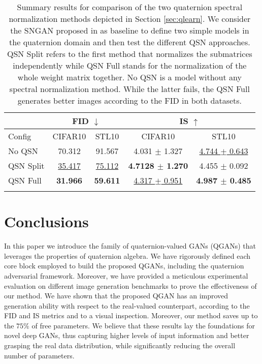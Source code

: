 \documentclass[graybox]{svmult}
\begin{document}
\begin{table}[t]
\caption{Summary results for comparison of the two quaternion spectral normalization methods depicted in Section \ref{sec:qlearn}. We consider the SNGAN proposed in \cite{Miyato2018SpectralNF} as baseline to define two simple models in the quaternion domain and then test the different QSN approaches. QSN Split refers to the first method that normalizes the submatrices independently while QSN Full stands for the normalization of the whole weight matrix together. No QSN is a model without any spectral normalization method. While the latter fails, the QSN Full generates better images according to the FID in both datasets.}
\centering
\begin{tabular}{@{}lcccc@{}}
\hline\noalign{\smallskip}
          & \multicolumn{2}{c}{FID $\downarrow$}           & \multicolumn{2}{c}{IS $\uparrow$}                              \\ \midrule
Config    & CIFAR10         & STL10           & CIFAR10                   & STL10                   \\
No QSN    & 70.312          &  91.567         & 4.031 $\pm$ 1.327 &  \underline{4.744 $\pm$ 0.643}          \\
QSN Split & \underline{35.417}          & \underline{75.112}          & \textbf{4.7128 $\pm$ 1.270} & 4.455 $\pm$ 0.092           \\
QSN Full  & \textbf{31.966} & \textbf{59.611} & \underline{4.317 $\pm$ 0.951}            & \textbf{4.987 $\pm$ 0.485} \\ 
\noalign{\smallskip}\hline\noalign{\smallskip}
\end{tabular}
\label{tab:qsn_tab}
\end{table}

\section{Conclusions}
\label{sec:conc}
\noindent In this paper we introduce the family of quaternion-valued GANs (QGANs) that leverages the properties of quaternion algebra. We have rigorously defined each core block employed to build the proposed QGANs, including the quaternion adversarial framework. Moreover, we have provided a meticulous experimental evaluation on different image generation benchmarks to prove the effectiveness of our method. We have shown that the proposed QGAN has an improved generation ability with respect to the real-valued counterpart, according to the FID and IS metrics and to a visual inspection. Moreover, our method saves up to the $75\%$ of free parameters. We believe that these results lay the foundations for novel deep GANs, thus capturing higher levels of input information and better grasping the real data distribution, while significantly reducing the overall number of parameters.



\end{document}
